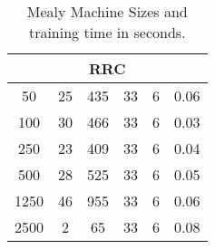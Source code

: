\begin{table}[]
\begin{tabular}{cccccc}
\multicolumn{6}{|c|}{\textbf{RRC}}                                                                                                                                                                                                                \\ \hline
\multicolumn{1}{|c|}{50}            & \multicolumn{1}{c|}{25}              & \multicolumn{1}{c|}{435}                  & \multicolumn{1}{c|}{33}             & \multicolumn{1}{c|}{6}               & \multicolumn{1}{c|}{0.06}                   \\ \hline
\multicolumn{1}{|c|}{100}           & \multicolumn{1}{c|}{30}              & \multicolumn{1}{c|}{466}                  & \multicolumn{1}{c|}{33}             & \multicolumn{1}{c|}{6}               & \multicolumn{1}{c|}{0.03}                   \\ \hline
\multicolumn{1}{|c|}{250}           & \multicolumn{1}{c|}{23}              & \multicolumn{1}{c|}{409}                  & \multicolumn{1}{c|}{33}             & \multicolumn{1}{c|}{6}               & \multicolumn{1}{c|}{0.04}                   \\ \hline
\multicolumn{1}{|c|}{500}           & \multicolumn{1}{c|}{28}              & \multicolumn{1}{c|}{525}                  & \multicolumn{1}{c|}{33}             & \multicolumn{1}{c|}{6}               & \multicolumn{1}{c|}{0.05}                   \\ \hline
\multicolumn{1}{|c|}{1250}          & \multicolumn{1}{c|}{46}              & \multicolumn{1}{c|}{955}                  & \multicolumn{1}{c|}{33}             & \multicolumn{1}{c|}{6}               & \multicolumn{1}{c|}{0.06}                   \\ \hline
\multicolumn{1}{|c|}{2500}          & \multicolumn{1}{c|}{2}               & \multicolumn{1}{c|}{65}                   & \multicolumn{1}{c|}{33}             & \multicolumn{1}{c|}{6}               & \multicolumn{1}{c|}{0.08}                   \\ \hline
\end{tabular}%
\caption{Mealy Machine Sizes and training time in seconds.}
\label{app:training_time_and_size_all_mm}
\end{table}


